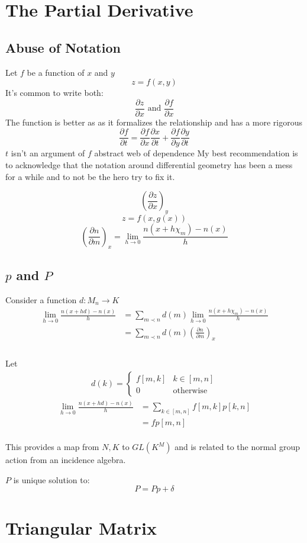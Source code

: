 \section{The Partial Derivative}

\subsection{Abuse of Notation}
Let $f$ be a function of $x$ and $y$
\[z = f(x,y)\]
It's common to write both:
\[\frac{\partial z}{\partial x}\text{ and }\frac{\partial f}{\partial x}\]
The function is better as as it formalizes the relationship and has a more rigorous 
\[\frac{\partial f}{\partial t} = \frac{\partial f}{\partial x}\frac{\partial x}{\partial t}+\frac{\partial f}{\partial y}\frac{\partial y}{\partial t}\]
$t$ isn't an argument of $f$
abstract web of dependence 
My best recommendation is to acknowledge that the notation around differential geometry has been a mess for a while and to not be the hero try to fix it.

\[\left(\frac{\partial z}{\partial x}\right)_y\]
\[z=f(x,g(x))\]
\[
	\left(\frac{\partial n}{\partial m}\right)_x =
	\lim_{h\rightarrow 0}\frac{n(x+h\chi_m)-n(x)}{h}
\]

\subsection{$p$ and $P$}
Consider a function $d:M_n\rightarrow K$
\[\begin{aligned}
	\lim_{h\rightarrow 0}\frac{n(x+hd)-n(x)}{h}
	&=\sum_{m\prec n}d(m)\lim_{h\rightarrow 0}\frac{n(x+h\chi_m)-n(x)}{h}\\
	&=\sum_{m\prec n}d(m)\left(\frac{\partial n}{\partial m}\right)_x\\
\end{aligned}\]
\\

Let 
\[\begin{aligned}
	d(k) = \begin{cases} f[m,k]&k\in[m,n]\\0&\text{otherwise}\end{cases}
\end{aligned}\]
\[\begin{aligned}
	\lim_{h\rightarrow 0}\frac{n(x+hd)-n(x)}{h}&=\sum_{k\in[m,n]}f[m,k]p[k,n]\\
	&=fp[m,n]\\
\end{aligned}\]

This provides a map from $N,K$ to $GL(K^M)$ and is related to the normal group action from an incidence algebra.

$P$ is unique solution to:
\[P=Pp+\delta\]

\section{Triangular Matrix}
